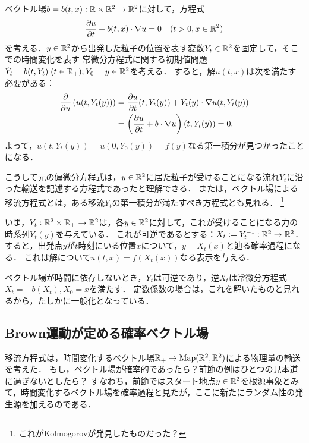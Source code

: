 \documentclass[uplatex,dvipdfmx]{jsreport}
\begin{document}
\begin{discussion}[変数係数の移流問題]
    ベクトル場$b=b(t,x):\mathbb{R}\times\mathbb{R}^2\to\mathbb{R}^2$に対して，方程式
    \[\frac{\partial u}{\partial t}+b(t,x)\cdot\nabla u=0\quad(t>0,x\in\mathbb{R}^2)\]
    を考える．$y\in\mathbb{R}^2$から出発した粒子の位置を表す変数$Y_t\in\mathbb{R}^2$を固定して，そこでの時間変化を表す
    常微分方程式に関する初期値問題$\dot{Y}_t=b(t,Y_t)\;(t\in\mathbb{R}_+);Y_0=y\in\mathbb{R}^2$を考える．
    すると，解$u(t,x)$は次を満たす必要がある：
    \begin{align*}
        \frac{\partial }{\partial u}\left(u(t,Y_t(y))\right)&=\frac{\partial u}{\partial t}(t,Y_t(y))+\dot{Y}_t(y)\cdot\nabla u(t,Y_t(y))\\
        &=\left(\frac{\partial u}{\partial t}+b\cdot\nabla u\right)(t,Y_t(y))=0.
    \end{align*}
    よって，$u(t,Y_t(y))=u(0,Y_0(y))=f(y)$なる第一積分が見つかったことになる．

    こうして元の偏微分方程式は，$y\in\mathbb{R}^2$に居た粒子が受けることになる流れ$Y_t$に沿った輸送を記述する方程式であったと理解できる．
    または，ベクトル場による移流方程式とは，ある移流$Y_t$の第一積分が満たすべき方程式とも見れる．
    \footnote{これがKolmogorovが発見したものだった？}
\end{discussion}
\begin{remark}[2つの関連]
    いま，$Y_t:\mathbb{R}^2\times\mathbb{R}_+\to\mathbb{R}^2$は，各$y\in\mathbb{R}^2$に対して，これが受けることになる力の時系列$Y_t(y)$を与えている．
    これが可逆であるとする：$X_t:=Y_t^{-1}:\mathbb{R}^2\to\mathbb{R}^2$．すると，出発点$y$が$t$時刻にいる位置$x$について，$y=X_t(x)$と辿る確率過程になる．
    これは解について$u(t,x)=f(X_t(x))$なる表示を与える．

    ベクトル場が時間に依存しないとき，$Y_t$は可逆であり，逆$X_t$は常微分方程式$\dot{X}_t=-b(X_t),X_0=x$を満たす．
    定数係数の場合は，これを解いたものと見れるから，たしかに一般化となっている．
\end{remark}

\subsection{Brown運動が定める確率ベクトル場}

\begin{tcolorbox}[colframe=ForestGreen, colback=ForestGreen!10!white,breakable,colbacktitle=ForestGreen!40!white,coltitle=black,fonttitle=\bfseries\sffamily,
title=]
    移流方程式は，時間変化するベクトル場$\mathbb{R}_+\to\mathrm{Map}(\mathbb{R}^2,\mathbb{R}^2)$による物理量の輸送を考えた．
    もし，ベクトル場が確率的であったら？前節の例はひとつの見本道に過ぎないとしたら？
    すなわち，前節ではスタート地点$y\in\mathbb{R}^2$を根源事象とみて，時間変化するベクトル場を確率過程と見たが，ここに新たにランダム性の発生源を加えるのである．
\end{tcolorbox}
\end{document}
